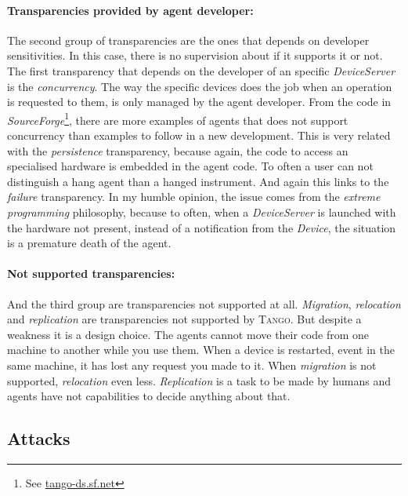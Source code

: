 \documentclass[10pt,a4paper,twoside]{llncs}
\newcommand{\tango}{\textsc{Tango}}
\begin{document}
\paragraph{Transparencies provided by agent developer:} The second group of transparencies are the ones that depends on developer sensitivities. In this case, there is no supervision about if it supports it or not. The first transparency that depends on the developer of an specific \emph{DeviceServer} is the \emph{concurrency}. The way the specific devices does the job when an operation is requested to them, is only managed by the agent developer. From the code in \emph{SourceForge}\footnote{See \href{http://tango-ds.sourceforge.net/}{tango-ds.sf.net}}, there are more examples of agents that does not support concurrency than examples to follow in a new development. This is very related with the \emph{persistence} transparency, because again, the code to access an specialised hardware is embedded in the agent code. To often a user can not distinguish a hang agent than a hanged instrument. And again this links to the \emph{failure} transparency. In my humble opinion, the issue comes from the \emph{extreme 
programming} philosophy, because to often, when a \emph{DeviceServer} is launched with the hardware not present, instead of a notification from the \emph{Device}, the situation is a premature death of the agent.

\paragraph{Not supported transparencies:} And the third group are transparencies not supported at all. \emph{Migration}, \emph{relocation} and \emph{replication} are transparencies not supported by \tango. But despite a weakness it is a design choice. The agents cannot move their code from one machine to another while you use them. When a device is restarted, event in the same machine, it has lost any request you made to it. When \emph{migration} is not supported, \emph{relocation} even less. \emph{Replication} is a task to be made by humans and agents have not capabilities to decide anything about that.

\subsection{Attacks}
\end{document}
